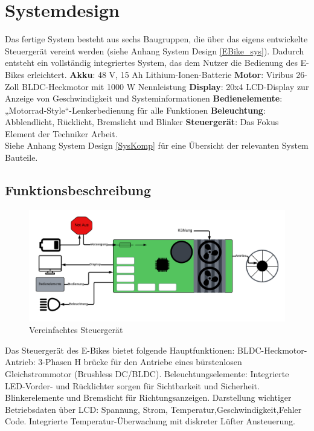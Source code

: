 \documentclass[paper=a4,11pt]{scrreprt}
\begin{document}
\chapter{Systemdesign}

Das fertige System besteht aus sechs Baugruppen, die über das eigens entwickelte Steuergerät vereint werden (siehe Anhang System Design \ref{EBike_sys}). Dadurch entsteht ein vollständig integriertes System, das dem Nutzer die Bedienung des E-Bikes erleichtert.
\textbf{Akku}: 48 V, 15 Ah Lithium-Ionen-Batterie
\textbf{Motor}: Viribus 26-Zoll BLDC-Heckmotor mit 1000 W Nennleistung
\textbf{Display}: 20x4 LCD-Display zur Anzeige von Geschwindigkeit und Systeminformationen
\textbf{Bedienelemente}: „Motorrad-Style“-Lenkerbedienung für alle Funktionen
\textbf{Beleuchtung}: Abblendlicht, Rücklicht, Bremslicht und Blinker
\textbf{Steuergerät}: Das Fokus Element der Techniker Arbeit.\\ Siehe Anhang System Design \ref{SysKomp} für eine Übersicht der relevanten System Bauteile.

\section{Funktionsbeschreibung}

\begin{figure}[ht]
\begin{center}
\includegraphics[width=14cm]{Bilder/Schaubild elektrik.PNG}
\caption{Vereinfachtes Steuergerät}
\label{ECU_sys}
\end{center}
\end{figure}

Das Steuergerät des E-Bikes bietet folgende Hauptfunktionen:
BLDC-Heckmotor-Antrieb: 3-Phasen H brücke für den Antriebe eines bürstenlosen Gleichstrommotor (Brushless DC/BLDC).
Beleuchtungselemente:
Integrierte LED-Vorder- und Rücklichter sorgen für Sichtbarkeit und Sicherheit.
Blinkerelemente und Bremslicht für Richtungsanzeigen.
Darstellung wichtiger Betriebsdaten über LCD:
Spannung, Strom, Temperatur,Geschwindigkeit,Fehler Code.
Integrierte Temperatur-Überwachung mit diskreter Lüfter Ansteuerung.
\end{document}
